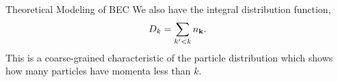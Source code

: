 \begin{chapter}{\label{cha:theoretical_model}Theoretical Modeling of BEC}
		We also have the integral distribution function,
		\begin{equation}
		D_k = \sum_{k'<k}n_{\bf k}.
		\label{eq:intDistFunc}
		\end{equation}
		This is a coarse-grained characteristic of the particle distribution which shows how many particles have momenta less than $k$.
\end{chapter}
